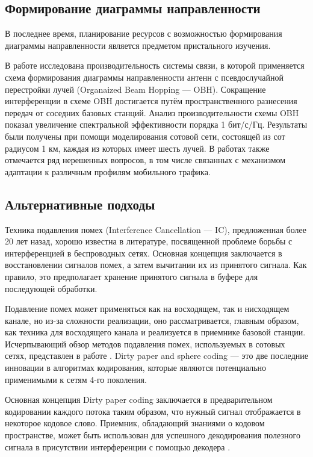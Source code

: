 \subsection{Формирование диаграммы направленности} \label{sect4_3}
В последнее время, планирование ресурсов с возможностью формирования диаграммы направленности \cite{svedman2007opportunistic} является предметом пристального изучения.

В работе \cite{hu2008radio} исследована производительность системы связи, в которой применяется схема формирования диаграммы направленности антенн с псевдослучайной перестройки лучей (Organaized Beam Hopping — OBH). Сокращение интерференции в схеме OBH достигается путём пространственного разнесения передач от соседних базовых станций. Анализ производительности схемы OBH показал увеличение спектральной эффективности порядка 1 бит/с/Гц. Результаты были получены при помощи моделирования сотовой сети, состоящей из сот радиусом 1 км, каждая из которых имеет шесть лучей. В работах также отмечается ряд нерешенных вопросов, в том числе связанных с механизмом адаптации к различным профилям мобильного трафика.


\subsection{Альтернативные подходы} \label{sect4_4}
Техника подавления помех (Interference Cancellation — IC), предложенная более 20 лет назад, хорошо известна в литературе, посвященной проблеме борьбы с интерференцией в беспроводных сетях. Основная концепция заключается в восстановлении сигналов помех, а затем вычитании их из принятого сигнала. Как правило, это предполагает хранение принятого сигнала в буфере для последующей обработки.

Подавление помех может применяться как на восходящем, так и нисходящем канале, но из-за сложности реализации, оно рассматривается, главным образом, как техника для восходящего канала и реализуется в приемнике базовой станции. Исчерпывающий обзор методов подавления помех, используемых в сотовых сетях, представлен в работе \cite{andrews2005interference}.
Dirty paper and sphere coding — это две последние инновации в алгоритмах кодирования, которые являются потенциально применимыми к сетям 4-го поколения.

Основная концепция Dirty paper coding заключается в предварительном кодировании каждого потока таким образом, что нужный сигнал отображается в некоторое кодовое слово. Приемник, обладающий знаниями о кодовом пространстве, может быть использован для успешного декодирования полезного сигнала в присутствии интерференции с помощью декодера \cite{choi2006capacity}.

